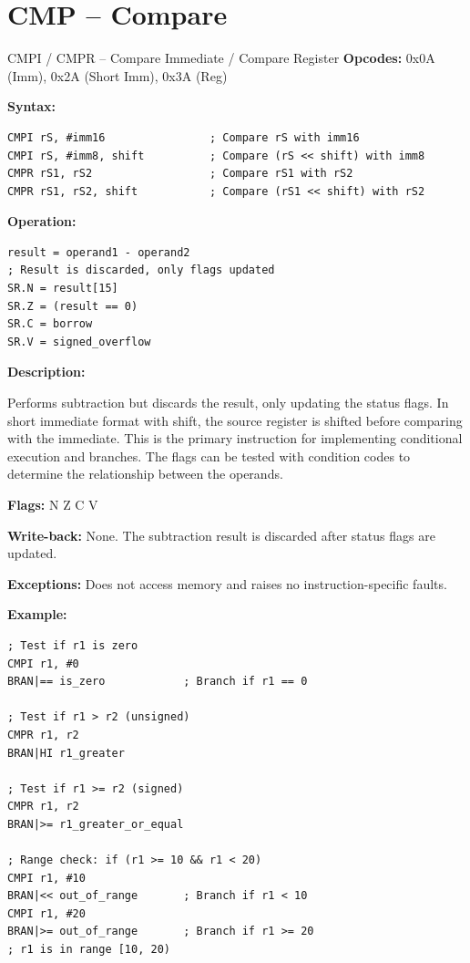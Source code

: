 \section{CMP -- Compare}

\begin{instructionbox}{CMPI / CMPR -- Compare Immediate / Compare Register}
	\textbf{Opcodes:} 0x0A (Imm), 0x2A (Short Imm), 0x3A (Reg)

	\textbf{Syntax:}
	\begin{lstlisting}
CMPI rS, #imm16                ; Compare rS with imm16
CMPI rS, #imm8, shift          ; Compare (rS << shift) with imm8
CMPR rS1, rS2                  ; Compare rS1 with rS2
CMPR rS1, rS2, shift           ; Compare (rS1 << shift) with rS2
\end{lstlisting}

	\textbf{Operation:}
	\begin{verbatim}
result = operand1 - operand2
; Result is discarded, only flags updated
SR.N = result[15]
SR.Z = (result == 0)
SR.C = borrow
SR.V = signed_overflow
\end{verbatim}

	\textbf{Description:}

	Performs subtraction but discards the result, only updating the status flags. In short immediate format with shift, the
	source register is shifted before comparing with the immediate. This is the primary instruction for implementing
	conditional execution and branches. The flags can be tested with condition codes to determine the relationship between
	the operands.

	\textbf{Flags:} N Z C V

	\textbf{Write-back:} None. The subtraction result is discarded after status flags are updated.

	\textbf{Exceptions:} Does not access memory and raises no instruction-specific faults.

	\textbf{Example:}
	\begin{lstlisting}
; Test if r1 is zero
CMPI r1, #0
BRAN|== is_zero            ; Branch if r1 == 0

; Test if r1 > r2 (unsigned)
CMPR r1, r2
BRAN|HI r1_greater

; Test if r1 >= r2 (signed)
CMPR r1, r2
BRAN|>= r1_greater_or_equal

; Range check: if (r1 >= 10 && r1 < 20)
CMPI r1, #10
BRAN|<< out_of_range       ; Branch if r1 < 10
CMPI r1, #20
BRAN|>= out_of_range       ; Branch if r1 >= 20
; r1 is in range [10, 20)
\end{lstlisting}


\end{instructionbox}
